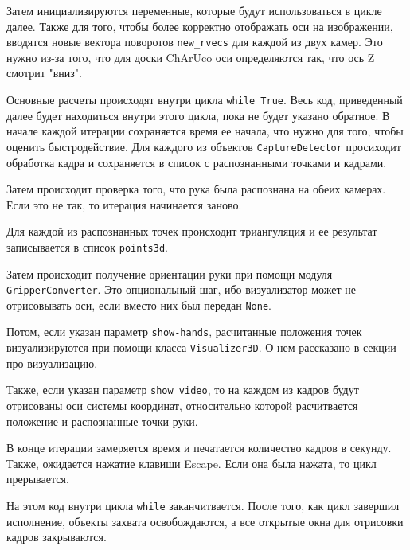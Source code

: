 \documentclass[12pt, a4paper]{article}
\begin{document}
Затем инициализируются переменные, которые будут использоваться в цикле далее.
Также для того, чтобы более корректно отображать оси на изображении, вводятся
новые вектора поворотов \texttt{new\_rvecs} для каждой из двух камер. Это нужно
из-за того, что для доски ChArUco оси определяются так, что ось Z смотрит "вниз".

Основные расчеты происходят внутри цикла \texttt{while True}. Весь код,
приведенный далее будет находиться внутри этого цикла, пока не будет указано
обратное. В начале каждой итерации сохраняется время ее начала, что нужно для
того, чтобы оценить быстродействие. Для каждого из объектов
\texttt{CaptureDetector} просиходит обработка кадра и сохраняется в список с
распознанными точками и кадрами.

Затем происходит проверка того, что рука была распознана на обеих камерах. Если
это не так, то итерация начинается заново.

Для каждой из распознанных точек происходит триангуляция и ее результат
записывается в список \texttt{points3d}.

Затем происходит получение ориентации руки при помощи модуля
\texttt{GripperConverter}. Это опциональный шаг, ибо визуализатор может не
отрисовывать оси, если вместо них был передан \texttt{None}.

Потом, если указан параметр \texttt{show-hands}, расчитанные положения точек визуализируются при помощи класса
\texttt{Visualizer3D}. О нем рассказано в секции про визуализацию.

Также, если указан параметр \texttt{show\_video}, то на каждом из кадров
будут отрисованы оси системы координат, относительно которой расчитвается
положение и распознанные точки руки.

В конце итерации замеряется время и печатается количество кадров в секунду.
Также, ожидается нажатие клавиши Escape. Если она была нажата, то цикл
прерывается.

На этом код внутри цикла \texttt{while} заканчитвается. После того, как цикл
завершил исполнение, объекты захвата освобождаются, а все открытые окна для
отрисовки кадров закрываются. 
\end{document}
